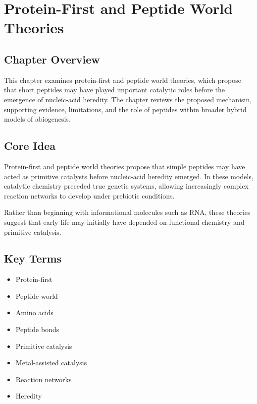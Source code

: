 \documentclass[
  oneside]{book}
\providecommand{\tightlist}{%
  \setlength{\itemsep}{0pt}\setlength{\parskip}{0pt}}
\begin{document}
\chapter{Protein-First and Peptide World Theories}\label{protein-first-and-peptide-world-theories}

\section{Chapter Overview}\label{chapter-overview-6}

This chapter examines protein-first and peptide world theories, which propose that short peptides may have played important catalytic roles before the emergence of nucleic-acid heredity. The chapter reviews the proposed mechanism, supporting evidence, limitations, and the role of peptides within broader hybrid models of abiogenesis.

\section{Core Idea}\label{core-idea-6}

Protein-first and peptide world theories propose that simple peptides may have acted as primitive catalysts before nucleic-acid heredity emerged. In these models, catalytic chemistry preceded true genetic systems, allowing increasingly complex reaction networks to develop under prebiotic conditions.

Rather than beginning with informational molecules such as RNA, these theories suggest that early life may initially have depended on functional chemistry and primitive catalysis.

\section{Key Terms}\label{key-terms-6}

\begin{itemize}
\tightlist
\item
  Protein-first
\item
  Peptide world
\item
  Amino acids
\item
  Peptide bonds
\item
  Primitive catalysis
\item
  Metal-assisted catalysis
\item
  Reaction networks
\item
  Heredity
\end{itemize}
\end{document}
